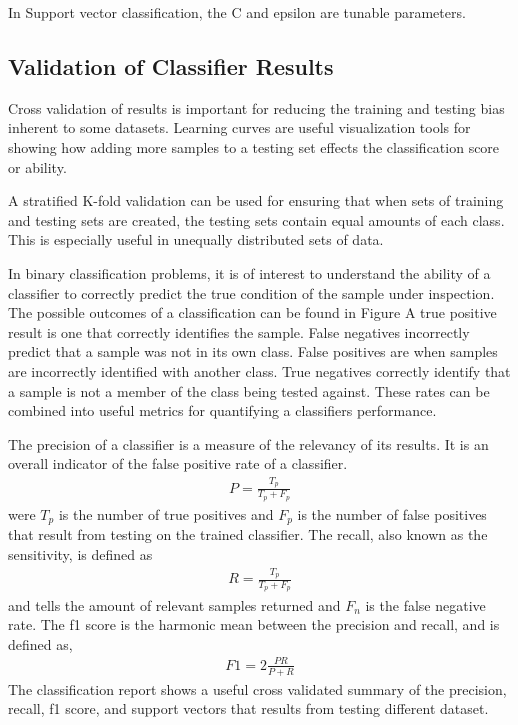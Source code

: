 In Support vector classification, the C and epsilon are tunable parameters.

\subsection{Validation of Classifier Results}
Cross validation of results is important for reducing the training and testing bias inherent to some datasets.  Learning curves are useful visualization tools for showing how adding more samples to a testing set effects the classification score or ability.

A stratified K-fold validation can be used for ensuring that when sets of training and testing sets are created, the testing sets contain equal amounts of each class.  This is especially useful in unequally distributed sets of data.

In binary classification problems, it is of interest to understand the ability of a classifier to correctly predict the true condition of the sample under inspection.  The possible outcomes of a classification can be found in Figure
A true positive result is one that correctly identifies the sample.  False negatives incorrectly predict that a sample was not in its own class.  False positives are when samples are incorrectly identified with another class.  True negatives correctly identify that a sample is not a member of the class being tested against.   These rates can be combined into useful metrics for quantifying a classifiers performance.

The precision of a classifier is a measure of the relevancy of its results.  It is an overall indicator of the false positive rate of a classifier.
%
\begin{align}
    P = \frac{T_p}{T_p + F_p}
\end{align}
%
were $T_p$ is the number of true positives and $F_p$ is the number of false positives that result from testing on the trained classifier.  The recall, also known as the sensitivity, is defined as
%
\begin{align}
    R = \frac{T_p}{T_p + F_p}
\end{align}
%
and tells the amount of relevant samples returned and $F_n$ is the false negative rate.  The f1 score is the harmonic mean between the precision and recall, and is defined as,
%
\begin{align}
    F1 = 2\frac{PR}{P + R}
\end{align}
%
The classification report shows a useful cross validated summary of the precision, recall, f1 score, and support vectors that results from testing different dataset.

